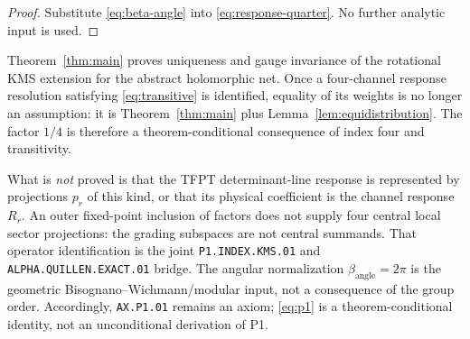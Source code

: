 \begin{proof}
Substitute \eqref{eq:beta-angle} into
\eqref{eq:response-quarter}.  No further analytic input is used.
\end{proof}

\begin{remark}
Theorem~\ref{thm:main} proves uniqueness and gauge invariance of the
rotational KMS extension for the abstract holomorphic net.  Once a
four-channel response resolution satisfying
\eqref{eq:transitive} is identified, equality of its weights is no
longer an assumption: it is Theorem~\ref{thm:main} plus
Lemma~\ref{lem:equidistribution}.  The factor $1/4$ is therefore a
theorem-conditional consequence of index four and transitivity.

What is \emph{not} proved is that the TFPT determinant-line response
is represented by projections $p_r$ of this kind, or that its
physical coefficient is the channel response $R_r$.  An outer
fixed-point inclusion of factors does not supply four central local
sector projections: the grading subspaces are not central summands.
That operator identification is the joint
\texttt{P1.INDEX.KMS.01} and
\texttt{ALPHA.QUILLEN.EXACT.01} bridge.
The angular normalization $\beta_{\mathrm{angle}}=2\pi$ is the
geometric Bisognano--Wichmann/modular input, not a consequence of
the group order.  Accordingly, \texttt{AX.P1.01} remains an axiom;
\eqref{eq:p1} is a theorem-conditional identity, not an unconditional
derivation of P1.
\end{remark}

